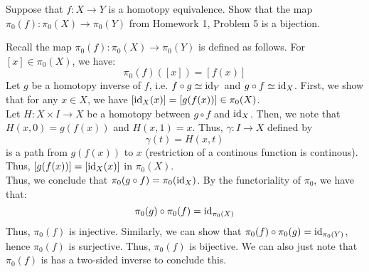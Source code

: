 \documentclass[12pt]{article}
\begin{document}


\begin{problab}{1}
    Suppose that $f: X \to Y$ is a homotopy equivalence. Show that the map $\pi_0(f): \pi_0(X) \to \pi_0(Y)$ from Homework 1, Problem 5 is a bijection.
\end{problab}
\begin{solu}
    Recall the map $\pi_0(f): \pi_0(X) \to \pi_0(Y)$ is defined as follows. For $[x] \in \pi_0(X)$, we have:
    \[ \pi_0(f)([x]) = [f(x)] \]
    Let $g$ be a homotopy inverse of $f$, i.e. $f \circ g \simeq \operatorname{id}_Y$ and $g \circ f \simeq \operatorname{id}_X$. First, we show that for any $x \in X$, we have $[\operatorname{id}_X(x)] = [g(f(x))] \in \pi_0(X)$. \\
    Let $H: X \times I \to X$ be a homotopy between $g \circ f$ and $\operatorname{id}_X$. Then, we note that $H(x, 0) = g(f(x))$ and $H(x, 1) = x$. Thus, $\gamma: I \to X$ defined by 
    \[ \gamma(t) = H(x, t)\]
    is a path from $g(f(x))$ to $x$ (restriction of a continous function is continous). Thus, $[g(f(x))] = [\operatorname{id}_X(x)]$ in $\pi_0(X)$. \\
    Thus, we conclude that $\pi_0(g \circ f) = \pi_0(\operatorname{id}_X)$. By the functoriality of $\pi_0$, we have that: 
    \[\pi_0(g) \circ \pi_0(f) = \operatorname{id}_{\pi_0(X)}\]
    Thus, $\pi_0(f)$ is injective. Similarly, we can show that $\pi_0(f) \circ \pi_0(g) = \operatorname{id}_{\pi_0(Y)}$, hence $\pi_0(f)$ is surjective. Thus, $\pi_0(f)$ is bijective. We can also just note that $\pi_0(f)$ is has a two-sided inverse to conclude this.
\end{solu}
\newpage
\end{document}
